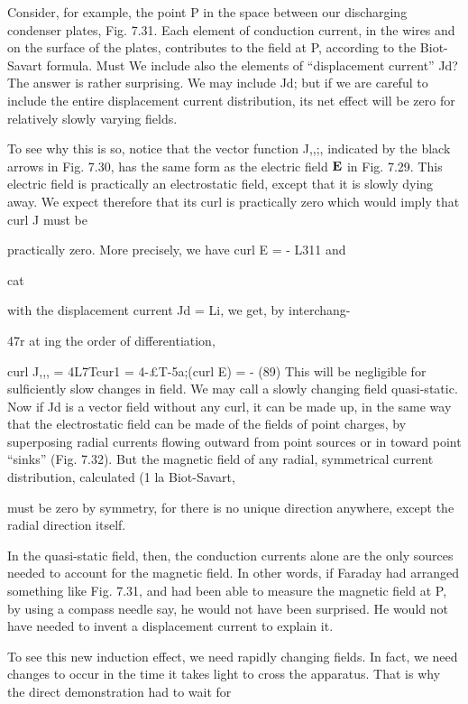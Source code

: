 Consider, for example, the point P in the space between our discharging
condenser plates, Fig. 7.31. Each element of conduction
current, in the wires and on the surface of the plates, contributes to
the field at P, according to the Biot-Savart formula. Must We include
also the elements of ``displacement current'' Jd? The answer is rather
surprising. We may include Jd; but if we are careful to include the
entire displacement current distribution, its net effect will be zero for
relatively slowly varying fields.

To see why this is so, notice that the vector function J,,;, indicated
by the black arrows in Fig. 7.30, has the same form as the electric
field $\mathbf{E}$ in Fig. 7.29. This electric field is practically an electrostatic
field, except that it is slowly dying away. We expect therefore that
its curl is practically zero which would imply that curl J must be

practically zero. More precisely, we have curl E = - L311 and

cat

with the displacement current Jd = Li, we get, by interchang-

47r at
ing the order of differentiation,

\begin{equation}
\end{equation}
curl J,,, = 4L7Tcur1  = 4-£T-5a;(curl E) = -  (89)
This will be negligible for sulficiently slow changes in field. We
may call a slowly changing field quasi-static. Now if Jd is a vector
field without any curl, it can be made up, in the same way that the
electrostatic field can be made of the fields of point charges, by superposing
radial currents flowing outward from point sources or in
toward point ``sinks'' (Fig. 7.32). But the magnetic field of any
radial, symmetrical current distribution, calculated (1 la Biot-Savart,

must be zero by symmetry, for there is no unique direction anywhere,
except the radial direction itself.

In the quasi-static field, then, the conduction currents alone are
the only sources needed to account for the magnetic field. In other
words, if Faraday had arranged something like Fig. 7.31, and had
been able to measure the magnetic field at P, by using a compass
needle say, he would not have been surprised. He would not have
needed to invent a displacement current to explain it.

To see this new induction effect, we need rapidly changing fields.
In fact, we need changes to occur in the time it takes light to cross
the apparatus. That is why the direct demonstration had to wait for


